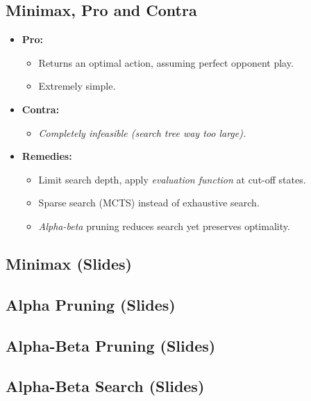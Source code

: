 \documentclass[conference, a4paper]{styles/acmsiggraph}
\begin{document}
\newpage

    \subsection{Minimax, Pro and Contra}
        \begin{itemize}
            \item \textbf{Pro:}
                \begin{itemize}
                    \item Returns an optimal action, assuming perfect opponent play.
                    \item Extremely simple.
                \end{itemize}
            \item \textbf{Contra:}
                \begin{itemize}
                    \item \textit{Completely infeasible (search tree way too large).}
                \end{itemize}
            \item \textbf{Remedies:}
                \begin{itemize}
                    \item Limit search depth, apply \textit{evaluation function} at cut-off states.
                    \item Sparse search (MCTS) instead of exhaustive search.
                    \item \textit{Alpha-beta} pruning reduces search yet preserves optimality.
                \end{itemize}
        \end{itemize}
    
    \subsection{Minimax (Slides)}
    \subsection{Alpha Pruning (Slides)}
    \subsection{Alpha-Beta Pruning (Slides)}
    \subsection{Alpha-Beta Search (Slides)}
    
\end{document}
